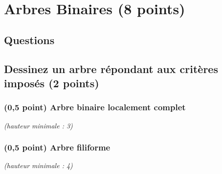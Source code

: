 \documentclass[11pt,a4paper]{article}
\begin{document}


\vspace*{-0.75cm}


\section{Arbres Binaires (8 points)}

\subsection*{Questions }


\subsection{Dessinez un arbre répondant aux critères imposés (2 points) }

%

\begin{table}[ht!]
  \centering
  \begin{minipage}{0.50\textwidth}
    \centering

\subsubsection{(0,5 point) Arbre binaire localement complet}

\textit{(hauteur minimale : 3)}

\vspace*{6.75cm}

  \end{minipage}
  \hfillx
  \begin{minipage}{0.50\textwidth}
    \centering

\subsubsection{(0,5 point) Arbre filiforme}

\textit{(hauteur minimale : 4)}

\vspace*{6.75cm}

  \end{minipage}
\end{table}
\end{document}
